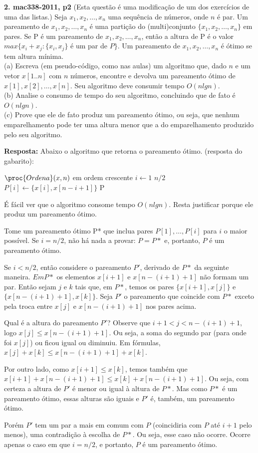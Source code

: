
\noindent \textbf{2. mac338-2011, p2} (Esta questão é uma modificação de um dos exercícios de uma das listas.) Seja $x_1, x_2, \ldots , x_n$ uma sequência de números, onde $n$ é par. Um pareamento de $x_1, x_2, \ldots , x_n$ é uma partição do (multi)conjunto $\{x_1, x_2, \ldots , x_n\}$ em pares. Se P é um pareamento de $x_1, x_2, \ldots , x_n$, então a altura de P é o valor $max\{x_i+x_j : \{x_i, x_j\}$ é um par de $P\}$. Um pareamento de $x_1, x_2, \ldots , x_n$ é ótimo se tem altura mínima.\\[6pt]

\noindent (a) Escreva (em pseudo-código, como nas aulas) um algoritmo que, dado $n$ e um vetor $x[1..n]$ com $n$ números, encontre e devolva um pareamento ótimo de $x[1], x[2], \dots , x[n]$. Seu algoritmo deve
consumir tempo $O(n lg n)$.\\[2pt]
(b) Analise o consumo de tempo do seu algoritmo, concluindo que de fato é $O(n lg n)$.\\[2pt]
(c) Prove que ele de fato produz um pareamento ótimo, ou seja, que nenhum emparelhamento pode ter uma altura menor que a do emparelhamento produzido pelo seu algoritmo.

\textbf{Resposta:} Abaixo o algoritmo que retorna o pareamento ótimo. (resposta do gabarito):
\begin{codebox}
\li $\proc{Ordena}(x, n)$ \Comment em ordem crescente
\li \For $i \gets 1$ \To $n/2$
\li \Do
        $P[i] \gets \{x[i], x[n- i + 1]\}$
    \End
\li \Return P
\end{codebox}

É fácil ver que o algoritmo consome tempo $O(n lg n)$. Resta justificar porque ele produz um pareamento ótimo.

Tome um pareamento ótimo P* que inclua pares $P[1], \ldots ,P[i]$ para $i$ o maior possível. Se $i = n/2$, não há nada a provar: $P = P*$ e, portanto, $P$ é um pareamento ótimo.

Se $i < n/2$, então considere o pareamento $P'$, derivado de $P*$ da seguinte maneira. $Em P*$ os elementos $x[i + 1]$ e $x[n - (i + 1) + 1]$ não formam um par. Então sejam $j$ e $k$ tais que, em $P*$, temos os pares $\{x[i+1], x[j]\}$ e $\{x[n-(i+1)+1], x[k]\}$. Seja $P'$ o pareamento que coincide com $P*$ exceto pela troca entre $x[j]$ e $x[n - (i + 1) + 1]$ nos pares acima.

Qual é a altura do pareamento $P'$?
Observe que $i+1 < j < n-(i+1)+1$, logo $x[j] \leq x[n-(i+1)+1]$. Ou seja, a soma do segundo par (para onde foi $x[j]$) ou ficou igual ou diminuiu. Em fórmulas, $x[j]+x[k] \leq x[n-(i+1)+1]+x[k]$.

Por outro lado, como $x[i+1] \leq x[k]$, temos também que $x[i+1]+x[n-(i+1)+1] \leq x[k]+x[n-(i+1)+1]$. Ou seja, com certeza a altura de $P'$ é menor ou igual à altura de $P*$. Mas como $P*$ é um pareamento ótimo, essas alturas são iguais e $P'$ é, também, um pareamento ótimo.

Porém $P'$ tem um par a mais em comum com $P$ (coincidiria com $P$ até $i+1$ pelo menos), uma contradição à escolha de $P*$. Ou seja, esse caso não ocorre. Ocorre apenas o caso em que $i = n/2$, e portanto, $P$ é um pareamento ótimo.